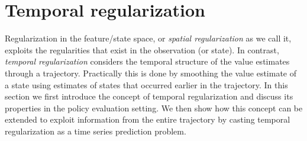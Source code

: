 \documentclass{article}
\begin{document}
\section{Temporal regularization}
\label{sec:temp_reg}
Regularization in the feature/state space, or \emph{spatial regularization} as we call it, exploits the regularities that exist in the observation (or state). In contrast, \emph{temporal regularization} considers the temporal structure of the value estimates through a trajectory. Practically this is done by smoothing the value estimate of a state using estimates of states that occurred earlier in the trajectory.
In this section we first introduce the concept of temporal regularization and discuss its properties in the policy evaluation setting. We then show how this concept can be extended to exploit information from the entire trajectory by casting temporal regularization as a time series prediction problem. 
\end{document}

